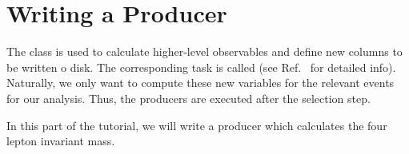 \section{Writing a Producer}\label{sec:producer}

The  class is used to calculate higher-level observables and define new columns to be written o disk. The corresponding task is called  (see Ref.~\cite{cf_repo} for detailed info). Naturally, we only want to compute these new variables for the relevant events for our analysis. Thus, the producers are executed after the selection step. 

In this part of the tutorial, we will write a producer which calculates the four lepton invariant mass.
